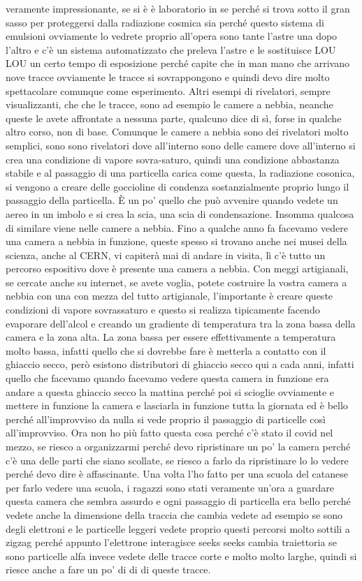 veramente impressionante, se si è è laboratorio in se perché si trova sotto il gran sasso per proteggersi dalla radiazione cosmica sia perché questo sistema di emulsioni ovviamente lo vedrete proprio all'opera sono tante l'astre una dopo l'altro e c'è un sistema automatizzato che preleva l'astre e le sostituisce LOU LOU un certo tempo di esposizione perché capite che in man mano che arrivano nove tracce ovviamente le tracce si sovrappongono e quindi devo dire molto spettacolare comunque come esperimento. Altri esempi di rivelatori, sempre visualizzanti, che che le tracce, sono ad esempio le camere a nebbia, neanche queste le avete affrontate a nessuna parte, qualcuno dice di sì, forse in qualche altro corso, non di base. Comunque le camere a nebbia sono dei rivelatori molto semplici, sono sono rivelatori dove all'interno sono delle camere dove all'interno si crea una condizione di vapore sovra-saturo, quindi una condizione abbastanza stabile e al passaggio di una particella carica come questa, la radiazione cosonica, si vengono a creare delle goccioline di condenza sostanzialmente proprio lungo il passaggio della particella. È un po' quello che può avvenire quando vedete un aereo in un imbolo e si crea la scia, una scia di condensazione. Insomma qualcosa di similare viene nelle camere a nebbia. Fino a qualche anno fa facevamo vedere una camera a nebbia in funzione, queste spesso si trovano anche nei musei della scienza, anche al CERN, vi capiterà mai di andare in visita, lì c'è tutto un percorso espositivo dove è presente una camera a nebbia. Con meggi artigianali, se cercate anche su internet, se avete voglia, potete costruire la vostra camera a nebbia con una con mezza del tutto artigianale, l'importante è creare queste condizioni di vapore sovrassaturo e questo si realizza tipicamente facendo evaporare dell'alcol e creando un gradiente di temperatura tra la zona bassa della camera e la zona alta. La zona bassa per essere effettivamente a temperatura molto bassa, infatti quello che si dovrebbe fare è metterla a contatto con il ghiaccio secco, però esistono distributori di ghiaccio secco qui a cada anni, infatti quello che facevamo quando facevamo vedere questa camera in funzione era andare a questa ghiaccio secco la mattina perché poi si scioglie ovviamente e mettere in funzione la camera e lasciarla in funzione tutta la giornata ed è bello perché all'improvviso da nulla si vede proprio il passaggio di particelle così all'improvviso. Ora non ho più fatto questa cosa perché c'è stato il covid nel mezzo, se riesco a organizzarmi perché devo ripristinare un po' la camera perché c'è una delle parti che siano scollate, se riesco a farlo da ripristinare lo lo vedere perché devo dire è affascinante. Una volta l'ho fatto per una scuola del catanese per farlo vedere una scuola, i ragazzi sono stati veramente un'ora a guardare questa camera che sembra assurdo e ogni passaggio di particella era bello perché vedete anche la dimensione della traccia che cambia vedete ad esempio se sono degli elettroni e le particelle leggeri vedete proprio questi percorsi molto sottili a zigzag perché appunto l'elettrone interagisce seeks seeks cambia traiettoria se sono particelle alfa invece vedete delle tracce corte e molto molto larghe, quindi si riesce anche a fare un po' di di di queste tracce. 

